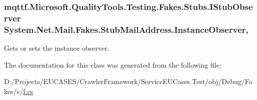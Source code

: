 \hypertarget{class_system_1_1_net_1_1_mail_1_1_fakes_1_1_stub_mail_address_ad2c3b48d73e43211a24c1e37eb6f7c50}{
\subsubsection[{Instance\-Observer}]{\setlength{\rightskip}{0pt plus 5cm}mqttf.\-Microsoft.\-Quality\-Tools.\-Testing.\-Fakes.\-Stubs.\-I\-Stub\-Observer System.\-Net.\-Mail.\-Fakes.\-Stub\-Mail\-Address.\-Instance\-Observer\hspace{0.3cm}{\ttfamily [get]}, {\ttfamily [set]}}}\label{class_system_1_1_net_1_1_mail_1_1_fakes_1_1_stub_mail_address_ad2c3b48d73e43211a24c1e37eb6f7c50}


Gets or sets the instance observer.



The documentation for this class was generated from the following file\-:\begin{DoxyCompactItemize}
\item 
D\-:/\-Projects/\-E\-U\-C\-A\-S\-E\-S/\-Crawler\-Framework/\-Service\-E\-U\-Cases.\-Test/obj/\-Debug/\-Fakes/s/\hyperlink{s_2f_8cs}{f.\-cs}\end{DoxyCompactItemize}
